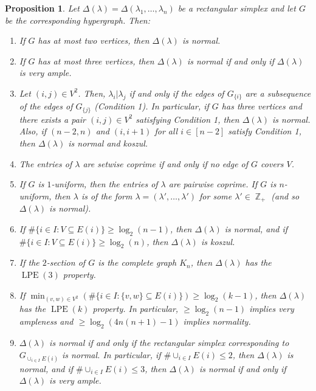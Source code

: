 \documentclass[a4paper,11pt]{amsart}
\theoremstyle{plain}
\newtheorem{proposition}[theorem]{Proposition}
\theoremstyle{definition}
\theoremstyle{remark}
\DeclareMathOperator{\ZZ}{\mathbb{Z}}
\DeclareMathOperator{\LPE}{LPE}
\begin{document}
\begin{proposition}\label{proposition:conditions-not-depending-on-weighting}
    Let $\Delta(\lambda) = \Delta(\lambda_1, \ldots, \lambda_n)$ be a rectangular simplex and let $G$ be the corresponding hypergraph. Then:
    \begin{enumerate}[1.]
        \item If $G$ has at most two vertices, then $\Delta(\lambda)$ is normal.
        \item If $G$ has at most three vertices, then $\Delta(\lambda)$ is normal if and only if $\Delta(\lambda)$ is very ample.
        \item Let $(i, j) \in V^2$. Then, $\lambda_i | \lambda_j$ if and only if the edges of $G_{\{i\}}$ are a subsequence of the edges of $G_{\{j\}}$ (Condition 1). In particular, if $G$ has three vertices and there exists a pair $(i, j) \in V^2$ satisfying Condition 1, then $\Delta(\lambda)$ is normal. Also, if $(n - 2, n)$ and $(i, i + 1)$ for all $i \in [n - 2]$ satisfy Condition 1, then $\Delta(\lambda)$ is normal and koszul.
        \item The entries of $\lambda$ are setwise coprime if and only if no edge of $G$ covers $V$.
        \item If $G$ is $1$-uniform, then the entries of $\lambda$ are pairwise coprime. If $G$ is $n$-uniform, then $\lambda$ is of the form $\lambda = (\lambda', \ldots, \lambda')$ for some $\lambda' \in \ZZ_+$ (and so $\Delta(\lambda)$ is normal).
        \item If $\# \{i \in I: V \subseteq E(i)\} \geq \log_2(n - 1)$, then $\Delta(\lambda)$ is normal, and if $\# \{i \in I: V \subseteq E(i)\} \geq \log_2(n)$, then $\Delta(\lambda)$ is koszul.
        \item If the $2$-section of $G$ is the complete graph $K_n$, then $\Delta(\lambda)$ has the $\LPE(3)$ property.
        \item If $\min_{(v, w) \in V^2} (\# \{i \in I: \{v, w\} \subseteq E(i)\}) \geq \log_2(k - 1)$, then $\Delta(\lambda)$ has the $\LPE(k)$ property. In particular, $\geq \log_2(n - 1)$ implies very ampleness and $\geq \log_2(4n(n + 1) - 1)$ implies normality.
        \item $\Delta(\lambda)$ is normal if and only if the rectangular simplex corresponding to $G_{\cup_{i \in I}E(i)}$ is normal. In particular, if $\# \cup_{i \in I} E(i) \leq 2$, then $\Delta(\lambda)$ is normal, and if $\# \cup_{i \in I} E(i) \leq 3$, then $\Delta(\lambda)$ is normal if and only if $\Delta(\lambda)$ is very ample.
    \end{enumerate}
\end{proposition}
\end{document}

